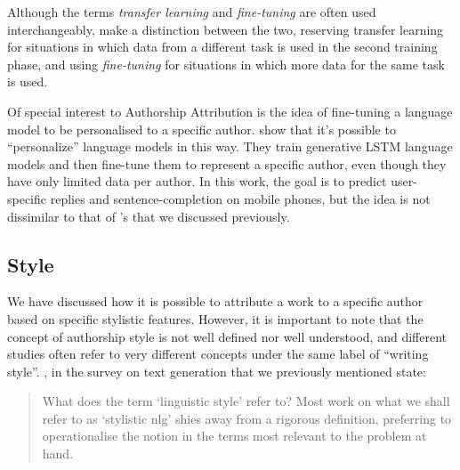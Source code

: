Although the terms \textit{transfer learning} and \textit{fine-tuning} are often used interchangeably, \citet{lalor2017improving} make a distinction between the two, reserving transfer learning for situations in which data from a different task is used in the second training phase, and using \textit{fine-tuning} for situations in which more data for the same task is used.

Of special interest to Authorship Attribution is the idea of fine-tuning a language model to be personalised to a specific author. \citet{yoon2017efficient} show that it's possible to ``personalize'' language models in this way. They train generative LSTM language models and then fine-tune them to represent a specific author, even though they have only limited data per author. In this work, the goal is to predict user-specific replies and sentence-completion on mobile phones, but the idea is not dissimilar to that of \citeauthor{bagnall2015author}'s that we discussed previously.

\subsection{Style}

We have discussed how it is possible to attribute a work to a specific author based on specific stylistic features. However, it is important to note that the concept of authorship style is not well defined nor well understood, and different studies often refer to very different concepts under the same label of ``writing style''.  \citet{gatt2017survey}, in the survey on text generation that we previously mentioned state:

\begin{quote}
What does the term `linguistic style' refer to? Most work on what we
shall refer to as `stylistic nlg' shies away from a rigorous definition,
preferring to operationalise the notion in the terms most relevant to
the problem at hand.
\end{quote}

